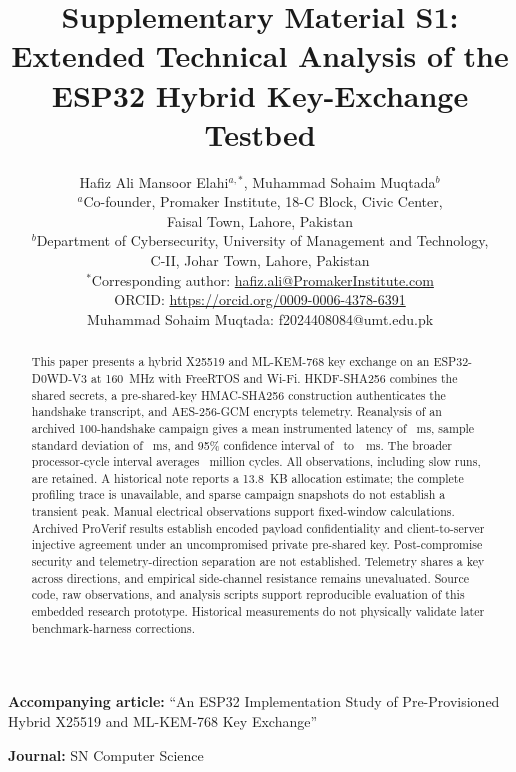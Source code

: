 \documentclass[journal, 10pt]{IEEEtran}
\begin{document}
\title{Supplementary Material S1: Extended Technical Analysis of the ESP32 Hybrid Key-Exchange Testbed}

\author{
    Hafiz Ali Mansoor Elahi$^{a,*}$, Muhammad Sohaim Muqtada$^{b}$\\
    $^{a}$Co-founder, Promaker Institute, 18-C Block, Civic Center,\\
    Faisal Town, Lahore, Pakistan\\
    $^{b}$Department of Cybersecurity, University of Management and Technology,\\
    C-II, Johar Town, Lahore, Pakistan\\
    $^{*}$Corresponding author: \href{mailto:hafiz.ali@PromakerInstitute.com}{hafiz.ali@PromakerInstitute.com}\\
    ORCID: \url{https://orcid.org/0009-0006-4378-6391}\\
    Muhammad Sohaim Muqtada: f2024408084@umt.edu.pk
}

\maketitle

\noindent\textbf{Accompanying article:} ``An ESP32 Implementation Study of Pre-Provisioned Hybrid X25519 and ML-KEM-768 Key Exchange''\par
\noindent\textbf{Journal:} SN Computer Science

\begin{abstract}
This paper presents a hybrid X25519 and ML-KEM-768 key exchange on an ESP32-D0WD-V3 at 160~MHz with FreeRTOS and Wi-Fi. HKDF-SHA256 combines the shared secrets, a pre-shared-key HMAC-SHA256 construction authenticates the handshake transcript, and AES-256-GCM encrypts telemetry. Reanalysis of an archived 100-handshake campaign gives a mean instrumented latency of \BenchmarkMeanMs~ms, sample standard deviation of \BenchmarkSdMs~ms, and 95\% confidence interval of \BenchmarkLowMs~to~\BenchmarkHighMs~ms. The broader processor-cycle interval averages \BenchmarkCyclesM~million cycles. All observations, including slow runs, are retained. A historical note reports a 13.8~KB allocation estimate; the complete profiling trace is unavailable, and sparse campaign snapshots do not establish a transient peak. Manual electrical observations support fixed-window calculations. Archived ProVerif results establish encoded payload confidentiality and client-to-server injective agreement under an uncompromised private pre-shared key. Post-compromise security and telemetry-direction separation are not established. Telemetry shares a key across directions, and empirical side-channel resistance remains unevaluated. Source code, raw observations, and analysis scripts support reproducible evaluation of this embedded research prototype. Historical measurements do not physically validate later benchmark-harness corrections.
\end{abstract}
\end{document}
